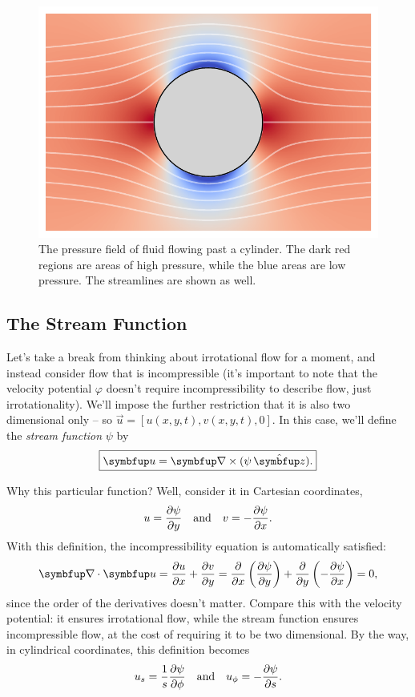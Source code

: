 \begin{figure}[t]
\centering\includegraphics[width=0.8\linewidth]{Figures/Chapter3/fig_cylinder_pressure}
\caption{The pressure field of fluid flowing past a cylinder.  The dark red regions are areas of high pressure, while the blue areas are low pressure.  The streamlines are shown as well.}
\label{fig_cyl_pressure}
\end{figure}


\subsection{The Stream Function}

Let's take a break from thinking about irrotational flow for a moment, and instead consider flow that is incompressible (it's important to note that the velocity potential $\varphi$ doesn't require incompressibility to describe flow, just irrotationality).  We'll impose the further restriction that it is also two dimensional only -- so $\vec{u} = [u(x, y, t), v(x, y, t), 0]$.  In this case, we'll define the \emph{stream function} $\psi$ by
\begin{equation}
\label{eq_stream_def}
\boxed{
\vec{u} = \curl (\psi \, \unit{z}).
}
\end{equation}

Why this particular function?  Well, consider it in Cartesian coordinates,
\begin{equation}
u = \frac{\partial {\psi}}{\partial {y}} \quad \text{and} \quad v = - \frac{\partial {\psi}}{\partial {x}}.
\end{equation}
With this definition, the incompressibility equation is automatically satisfied:
\[
\grad \cdot \uu = \dfdx{u}{x} + \dfdx{v}{y} = \dfdx{}{x} \left( \dfdx{\psi}{y} \right) + \dfdx{}{y} \left( - \dfdx{\psi}{x} \right) = 0,
\]
since the order of the derivatives doesn't matter.  Compare this with the velocity potential:  it ensures irrotational flow, while the stream function ensures incompressible flow, at the cost of requiring it to be two dimensional.  By the way, in cylindrical coordinates, this definition becomes
\begin{equation}
\label{eq_stream_cyl}
u_s = \frac{1}{s} \frac{\partial {\psi}}{\partial {\phi}} \quad \text{and} \quad u_\phi = - \frac{\partial {\psi}}{\partial {s}}.
\end{equation}

